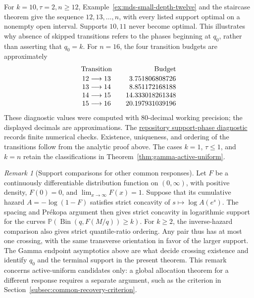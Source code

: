 \documentclass[11pt]{article}
\theoremstyle{definition}
\theoremstyle{remark}
\newtheorem{remark}[theorem]{Remark}
\DeclareMathOperator{\Bin}{Bin}
\newcommand{\Pbb}{\mathbb P}
\newcommand{\1}{\mathbf 1}
\begin{document}
For \(k=10,\tau=2,n\ge12\),
Example~\ref{ex:mds-small-depth-twelve} and the staircase theorem give
the sequence \(12,13,\ldots,n\), with every listed support optimal
on a nonempty open interval. Supports \(10,11\) never become optimal.
This illustrates why absence of skipped transitions refers to the
phases beginning at \(q_0\), rather than asserting that \(q_0=k\).
For \(n=16\), the four transition budgets are approximately
\[
\begin{array}{c@{\qquad}r}
\text{Transition}&\text{Budget}\\[2pt]
12\longrightarrow13&3.751806808726\\
13\longrightarrow14&8.851172168188\\
14\longrightarrow15&14.333018261348\\
15\longrightarrow16&20.197931039196
\end{array}
\]
These diagnostic values were computed with 80-decimal working
precision; the displayed decimals are approximations. The
\href{https://github.com/long-mathematics/mds-coverage-optimization/blob/main/scripts/verify_support_phases.py}{repository support-phase diagnostic}
records finite numerical checks. Existence, uniqueness, and ordering
of the transitions follow from the analytic proof above.
The cases \(k=1\), \(\tau\le1\), and \(k=n\) retain the
classifications in Theorem~\ref{thm:gamma-active-uniform}.

\begin{remark}[Support comparisons for other common responses]
\label{rem:mds-common-response-support}
Let \(F\) be a continuously differentiable distribution function on
\((0,\infty)\), with positive density, \(F(0)=0\), and
\(\lim_{x\to\infty}F(x)=1\). Suppose that its cumulative hazard
\(A=-\log(1-F)\) satisfies strict concavity of
\(s\mapsto\log A(e^s)\). The spacing and Pr\'ekopa argument then
gives strict concavity in logarithmic support for the curves
\(\Pbb(\Bin(q,F(M/q))\ge k)\). For \(k\ge2\), the inverse-hazard
comparison also gives strict quantile-ratio ordering. Any pair thus
has at most one crossing, with the same transverse orientation in
favor of the larger support. The Gamma endpoint asymptotics above
are what decide crossing existence and identify \(q_0\) and the
terminal support in the present theorem. This remark concerns
active-uniform candidates only: a global allocation theorem for a
different response requires a separate argument, such as the criterion
in Section~\ref{subsec:common-recovery-criterion}.
\end{remark}
\end{document}
